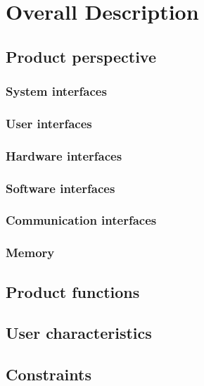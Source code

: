 \section{Overall Description}
\subsection{Product perspective}
\subsubsection{System interfaces}
\subsubsection{User interfaces}
\subsubsection{Hardware interfaces}
% 
\subsubsection{Software interfaces}
\subsubsection{Communication interfaces}
\subsubsection{Memory}

\subsection{Product functions}
\subsection{User characteristics}
\subsection{Constraints}

